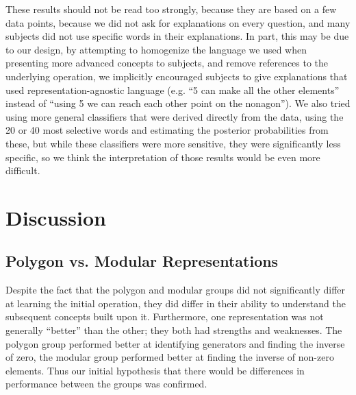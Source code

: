 \documentclass[man,10pt]{apa6}
\begin{document}
These results should not be read too strongly, because they are based on a few data points, because we did not ask for explanations on every question, and many subjects did not use specific words in their explanations. In part, this may be due to our design, by attempting to homogenize the language we used when presenting more advanced concepts to subjects, and remove references to the underlying operation, we implicitly encouraged subjects to give explanations that used representation-agnostic language (e.g. ``5 can make all the other elements'' instead of ``using 5 we can reach each other point on the nonagon''). We also tried using more general classifiers that were derived directly from the data, using the 20 or 40 most selective words and estimating the posterior probabilities from these, but while these classifiers were more sensitive, they were significantly less specific, so we think the interpretation of those results would be even more difficult. 
\section{Discussion}
\subsection{Polygon vs. Modular Representations}
Despite the fact that the polygon and modular groups did not significantly differ at learning the initial operation, they did differ in their ability to understand the subsequent concepts built upon it. Furthermore, one representation was not generally ``better'' than the other; they both had strengths and weaknesses. The polygon group performed better at identifying generators and finding the inverse of zero, the modular group performed better at finding the inverse of non-zero elements. Thus our initial hypothesis that there would be differences in performance between the groups was confirmed.\par 
\end{document}
